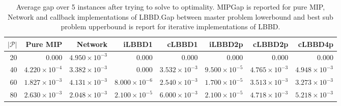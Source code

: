 \begin{table*}
    \centering
    \caption{Average gap over 5 instances after trying to solve to optimality. MIPGap is reported for pure MIP, Network and callback implementations of LBBD.\@ Gap between master problem lowerbound and best sub problem upperbound is report for iterative implementations of LBBD.}
    \begin{tabular}{rrrrrrrr} \toprule
        $|\mathcal{P}|$ & Pure MIP & Network & iLBBD1 & cLBBD1 & iLBBD2p & cLBBD2p & cLBBD4p \\ \midrule
        20              & 0.000 &    $4.950 \times 10^{-3}$     & 0.000 &  0.000 & 0.000 & 0.000 & 0.000 \\
        40              & $4.220 \times 10^{-4}$ & $3.382 \times 10^{-3}$  & 0.000 & $3.532 \times 10^{-3}$ & $9.500 \times 10^{-5}$ & $4.765 \times 10^{-3}$ & $4.948 \times 10^{-3}$ \\
        60 & $1.827 \times 10^{-3}$ & $4.131 \times 10^{-3}$ & $8.000 \times 10^{-6}$ & $2.540 \times 10^{-3}$ & $1.700 \times 10^{-5}$ & $3.513 \times 10^{-3}$ & $3.273 \times 10^{-3}$ \\
        80 &  $2.630 \times 10^{-3}$ &  $2.048 \times 10^{-3}$ & $2.100 \times 10^{-5}$ &  $6.000 \times 10^{-3}$ & $2.100 \times 10^{-5}$ & $4.718 \times 10^{-3}$ & $5.218 \times 10^{-3}$ \\
        \bottomrule
    \end{tabular}
\end{table*}

